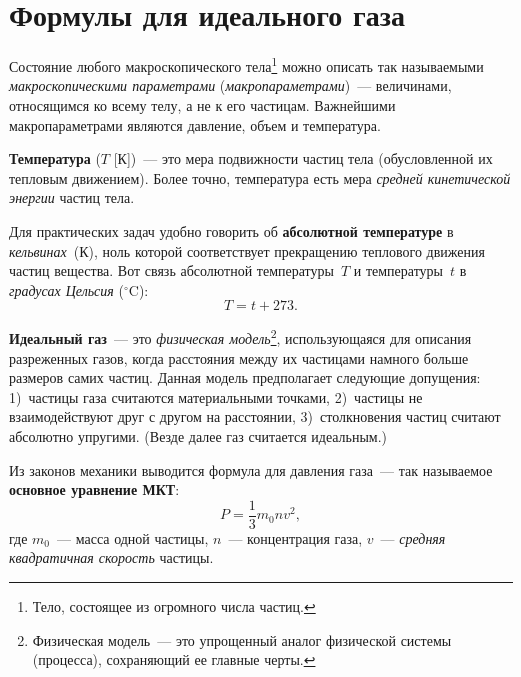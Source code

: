 \documentclass[main.tex]{subfiles}
\begin{document}

 

 

 
   

\section{Формулы для идеального газа}


Состояние любого макроскопического тела\footnote{Тело, состоящее из огромного числа частиц.} можно описать так называемыми \emph{макроскопическими параметрами} (\emph{макропараметрами})~--- величинами, относящимся ко всему телу, а не к его частицам. Важнейшими макропараметрами являются давление, объем и температура.

\textbf{Температура} ($T$ [К])~--- это мера подвижности частиц тела (обусловленной их тепловым движением). Более точно, температура есть мера \emph{средней кинетической энергии} частиц тела.



Для практических задач удобно говорить об \textbf{абсолютной температуре} в \emph{кельвинах}~(К), ноль которой соответствует прекращению теплового движения частиц вещества. Вот связь абсолютной температуры~$T$ и температуры~$t$ в \emph{градусах Цельсия} ($^\circ\mathrm{C}$):
\begin{equation}
    T=t+273.
\end{equation}

\textbf{Идеальный газ}~--- это \emph{физическая модель}\footnote{Физическая модель~--- это упрощенный аналог физической системы (процесса), сохраняющий ее главные черты.}, использующаяся для описания разреженных газов, когда расстояния между их частицами намного больше размеров самих частиц. Данная модель предполагает следующие допущения: 1)~частицы газа считаются материальными точками, 2)~частицы не взаимодействуют друг с другом на расстоянии, 3)~столкновения частиц считают абсолютно упругими. (Везде далее газ считается идеальным.)

Из законов механики выводится формула для давления газа~--- так называемое \textbf{основное уравнение МКТ}:
\begin{equation}
    \label{4eqgas_e1}
    P=\frac{1}{3}m_0nv^2,
\end{equation}
где $m_0$~--- масса одной частицы, $n$~--- концентрация газа, $v$~--- \emph{средняя квадратичная скорость} частицы.
\end{document}
